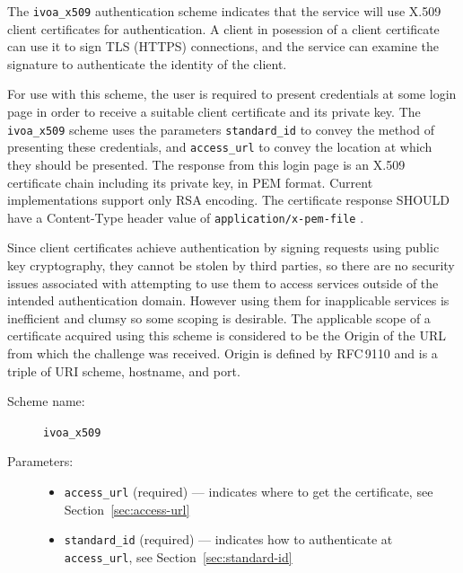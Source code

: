 \documentclass[11pt,a4paper]{ivoa}
\newcommand{\rfc}[1]{RFC\,#1}
\begin{document}
The \verb|ivoa_x509| authentication scheme indicates that the
service will use X.509 client certificates for authentication.
A client in posession of a client certificate can use it to
sign TLS (HTTPS) connections, and the service can examine the signature
to authenticate the identity of the client.


For use with this scheme, the user is required to present credentials
at some login page in order to receive a suitable client certificate
and its private key.
The \verb|ivoa_x509| scheme uses the parameters 
\verb|standard_id| to convey the method of presenting these credentials, and
\verb|access_url| to convey the location at which they should be presented.
The response from this login page is an X.509 certificate chain 
including its private key, in PEM format.
Current implementations support only RSA encoding.
The certificate response SHOULD have a Content-Type header value of
{\tt application/x-pem-file} .

Since client certificates achieve authentication by signing requests
using public key cryptography, they cannot be stolen by third parties,
so there are no security issues associated with attempting to use them
to access services outside of the intended authentication domain.
However using them for inapplicable services is inefficient and clumsy
so some scoping is desirable.
The applicable scope of a certificate acquired using this scheme is
considered to be the Origin of the URL from which
the challenge was received.
Origin is defined by \rfc{9110}
and is a triple of URI scheme, hostname, and port.


\begin{description}
  \item[Scheme name:] \verb|ivoa_x509|
  \item[Parameters:] \mbox{}
  \begin{itemize}
    \item \verb|access_url| (required) ---
          indicates where to get the certificate,
          see Section~\ref{sec:access-url}
    \item \verb|standard_id| (required) ---
          indicates how to authenticate at \verb|access_url|,
          see Section~\ref{sec:standard-id}
  \end{itemize}
\end{description}
\end{document}
